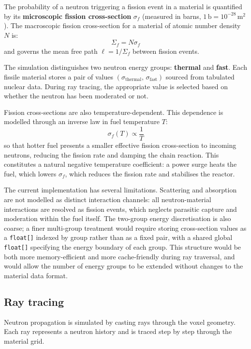 \documentclass{report}
\begin{document}
The probability of a neutron triggering a fission event in a material is quantified by
its \textbf{microscopic fission cross-section} $\sigma_f$ (measured in barns,
$1\,\text{b} = 10^{-28}\,\text{m}^2$). The macroscopic fission cross-section for a
material of atomic number density $N$ is:
\[
\Sigma_f = N \sigma_f
\]
and governs the mean free path $\ell = 1/\Sigma_f$ between fission events.

The simulation distinguishes two neutron energy groups: \textbf{thermal} and \textbf{fast}.
Each fissile material stores a pair of values $(\sigma_{\text{thermal}},\, \sigma_{\text{fast}})$
sourced from tabulated nuclear data. During ray tracing, the appropriate value is selected
based on whether the neutron has been moderated or not.

Fission cross-sections are also temperature-dependent. This dependence is modelled through
an inverse law in fuel temperature $T$:
\[
\sigma_f(T) \propto \frac{1}{T}
\]
so that hotter fuel presents a smaller effective fission cross-section to incoming neutrons,
reducing the fission rate and damping the chain reaction. This constitutes a natural
negative temperature coefficient: a power surge heats the fuel, which lowers $\sigma_f$,
which reduces the fission rate and stabilises the reactor.

The current implementation has several limitations. Scattering and absorption are not
modelled as distinct interaction channels: all neutron-material interactions are resolved
as fission events, which neglects parasitic capture and moderation within the fuel itself.
The two-group energy discretisation is also coarse; a finer multi-group treatment would
require storing cross-section values as a \texttt{float[]} indexed by group rather than
as a fixed pair, with a shared global \texttt{float[]} specifying the energy boundary of
each group. This structure would be both more memory-efficient and more cache-friendly
during ray traversal, and would allow the number of energy groups to be extended without
changes to the material data format.

\subsection{Ray tracing}

Neutron propagation is simulated by casting rays through the voxel geometry. Each ray
represents a neutron history and is traced step by step through the material grid.
\end{document}
